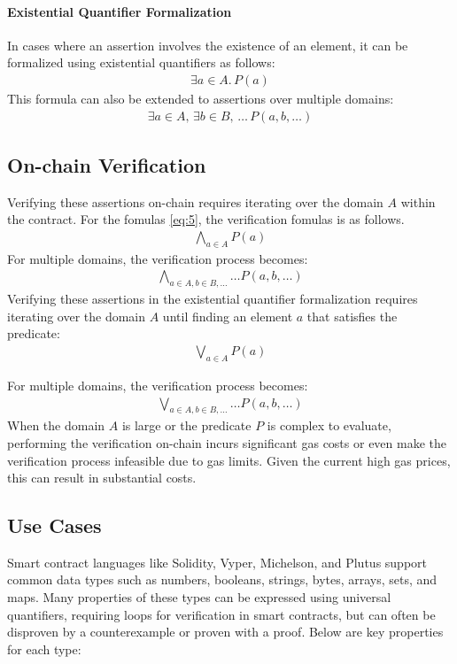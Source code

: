 \documentclass[runningheads]{llncs}
\begin{document}
\paragraph{Existential Quantifier Formalization}
In cases where an assertion involves the existence of an element, it can be formalized using existential quantifiers as follows:
\begin{gather}
  \label{eq:3}
  \exists a \in A. \, P(a)
\end{gather}
This formula can also be extended to assertions over multiple domains:
\begin{gather}
  \label{eq:4}
  \exists a \in A, \, \exists b \in B, \, \dots \, P(a, b, \dots)
\end{gather}
\subsection{On-chain Verification}
Verifying these assertions on-chain requires iterating over the domain \(A\) within the contract. For the fomulas \ref{eq:5}, the verification fomulas is as follows.
\begin{gather}
  \label{eq:5}
  \bigwedge_{a \in A} P(a)
\end{gather}
For multiple domains, the verification process becomes:
\begin{gather}
  \label{eq:6}
  \bigwedge_{a \in A, b \in B, \dots} \dots P(a, b, \dots)
\end{gather}
Verifying these assertions in  the existential quantifier formalization requires iterating over the domain \(A\) until finding an element \(a\) that satisfies the predicate:
\begin{gather}
  \label{eq:7}
  \bigvee_{a \in A} P(a)
\end{gather}

For multiple domains, the verification process becomes:
\begin{gather}
  \label{eq:8}
  \bigvee_{a \in A, b \in B, \dots} \dots P(a, b, \dots)
\end{gather}
When the domain \(A\) is large or the predicate \(P\) is complex to evaluate, performing the verification on-chain incurs significant gas costs or even make the verification process infeasible due to gas limits. Given the current high gas prices, this can result in substantial costs.
\subsection{Use Cases}
Smart contract languages like Solidity, Vyper, Michelson, and Plutus support common data types such as numbers, booleans, strings, bytes, arrays, sets, and maps. Many properties of these types can be expressed using universal quantifiers, requiring loops for verification in smart contracts, but can often be disproven by a counterexample or proven with a proof. Below are key properties for each type:
\end{document}
